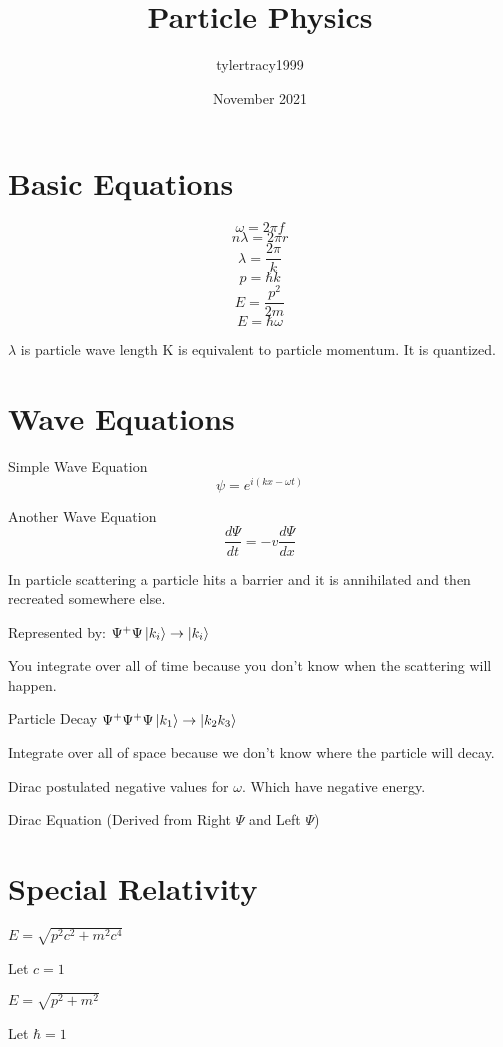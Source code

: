 \documentclass{article}
\title{Particle Physics}
\author{tylertracy1999 }
\date{November 2021}
\begin{document}
\maketitle




\section{Basic Equations}

$$ \omega = 2 \pi f $$
$$n\lambda = 2 \pi r$$
$$ \lambda = \frac{2\pi}{k} $$
$$ p = \hbar k $$
$$ E = \frac{p^2}{2m} $$
$$ E =  \hbar \omega $$

$\lambda$ is particle wave length
K is equivalent to particle momentum. It is quantized.

\section{Wave Equations}

Simple Wave Equation
$$ \psi = e^{i(kx - \omega t)}$$

Another Wave Equation
$$ \frac{d\Psi}{dt} = -v \frac{d\Psi}{dx}  $$

In particle scattering a particle hits a barrier and it is annihilated and then recreated somewhere else.

Represented by:
$\Psi^+ \Psi \ket{k_i} \rightarrow \ket{k_i}$

You integrate over all of time because you don't know when the scattering will happen.


Particle Decay
$\Psi^+ \Psi^+ \Psi \ket{k_1} \rightarrow \ket{k_2 k_3}$

Integrate over all of space because we don't know where the particle will decay.



Dirac postulated negative values for $\omega$. Which have negative energy.


Dirac Equation (Derived from Right $\Psi$ and Left $\Psi$)




\section{Special Relativity}

$E = \sqrt{p^2c^2 + m^2c^4}$

Let $c = 1$

$E = \sqrt{p^2 + m^2}$

Let $ \hbar = 1$
\end{document}
